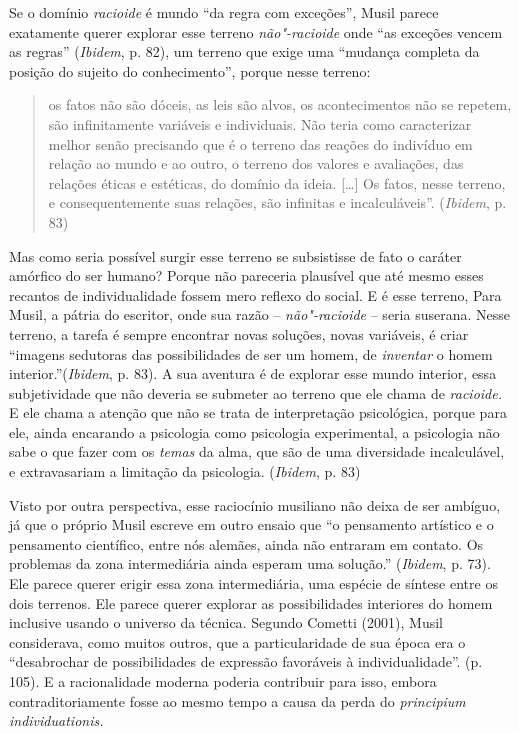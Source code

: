 Se o domínio \emph{racioide} é mundo ``da regra com exceções'', Musil
parece exatamente querer explorar esse terreno \emph{não"-racioide} onde
``as exceções vencem as regras'' (\emph{Ibidem}, p. 82), um terreno que
exige uma ``mudança completa da posição do sujeito do conhecimento'',
porque nesse terreno:

\begin{quote}
os fatos não são dóceis, as leis são alvos, os acontecimentos não se
repetem, são infinitamente variáveis e individuais. Não teria como
caracterizar melhor senão precisando que é o terreno das reações do
indivíduo em relação ao mundo e ao outro, o terreno dos valores e
avaliações, das relações éticas e estéticas, do domínio da ideia.
[\ldots{}] Os fatos, nesse terreno, e consequentemente suas relações, são
infinitas e incalculáveis''. (\emph{Ibidem}, p. 83)
\end{quote}

Mas como seria possível surgir esse terreno se subsistisse de fato o
caráter amórfico do ser humano? Porque não pareceria plausível que até
mesmo esses recantos de individualidade fossem mero reflexo do social. E
é esse terreno, Para Musil, a pátria do escritor, onde sua razão --
\emph{não"-racioide} -- seria suserana. Nesse terreno, a tarefa é sempre
encontrar novas soluções, novas variáveis, é criar ``imagens sedutoras
das possibilidades de ser um homem, de \emph{inventar} o homem
interior.''(\emph{Ibidem}, p. 83). A sua aventura é de explorar esse
mundo interior, essa subjetividade que não deveria se submeter ao
terreno que ele chama de \emph{racioide.} E ele chama a atenção que não
se trata de interpretação psicológica, porque para ele, ainda encarando
a psicologia como psicologia experimental, a psicologia não sabe o que
fazer com os \emph{temas} da alma, que são de uma diversidade
incalculável, e extravasariam a limitação da psicologia. (\emph{Ibidem},
p. 83)

Visto por outra perspectiva, esse raciocínio musiliano não deixa de ser
ambíguo, já que o próprio Musil escreve em outro ensaio que ``o
pensamento artístico e o pensamento científico, entre nós alemães, ainda
não entraram em contato. Os problemas da zona intermediária ainda
esperam uma solução.'' (\emph{Ibidem}, p. 73). Ele parece querer erigir
essa zona intermediária, uma espécie de síntese entre os dois terrenos.
Ele parece querer explorar as possibilidades interiores do homem
inclusive usando o universo da técnica. Segundo Cometti (2001), Musil
considerava, como muitos outros, que a particularidade de sua época era
o ``desabrochar de possibilidades de expressão favoráveis à
individualidade''. (p. 105). E a racionalidade moderna poderia
contribuir para isso, embora contraditoriamente fosse ao mesmo tempo a
causa da perda do \emph{principium} \emph{individuationis.}

